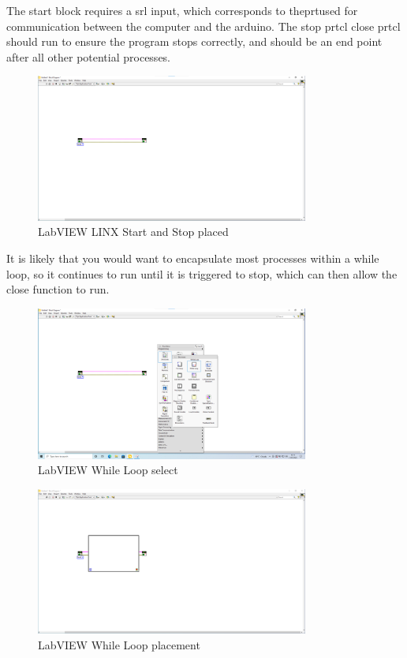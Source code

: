 \documentclass[a4paper,11pt]{report}
\begin{document}
The start block requires a \gls{srl} input, which corresponds to the\gls{prt}used for communication between the computer and the arduino. The stop \gls{prtcl} close \gls{prtcl} should run to ensure the program stops correctly, and should be an end point after all other potential processes.

\begin{figure}[H]
\centering
\includegraphics[width=0.8\textwidth]{screenshots/labview7}
\caption{LabVIEW LINX Start and Stop placed}
\end{figure}

It is likely that you would want to encapsulate most processes within a while loop, so it continues to run until it is triggered to stop, which can then allow the close function to run.

\begin{figure}[H]
\centering
\includegraphics[width=0.8\textwidth]{screenshots/labview8}
\caption{LabVIEW While Loop select}
\end{figure}

\begin{figure}[H]
\centering
\includegraphics[width=0.8\textwidth]{screenshots/labview9}
\caption{LabVIEW While Loop placement}
\end{figure}
\end{document}
